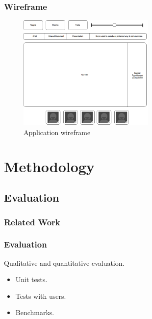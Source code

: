 \documentclass[compress]{beamer}
\begin{document}
\begin{frame}[c]
		\frametitle{Wireframe}
		\begin{figure}[H]
			\includegraphics[width=0.6\textwidth]{figures/pbf.png}
			\caption{Application wireframe}
		\end{figure}
	\end{frame}

\section{Methodology}\label{meth} %
\subsection{Evaluation}
\begin{frame}[t,shrink]
\frametitle{Related Work} 
\end{frame}
\begin{frame}[c]
		\frametitle{Evaluation}
Qualitative and quantitative evaluation.

		\begin{itemize}
		\item Unit tests.
		\item Tests with users.
		\item Benchmarks.
		\end{itemize}
	\end{frame}
\end{document}
